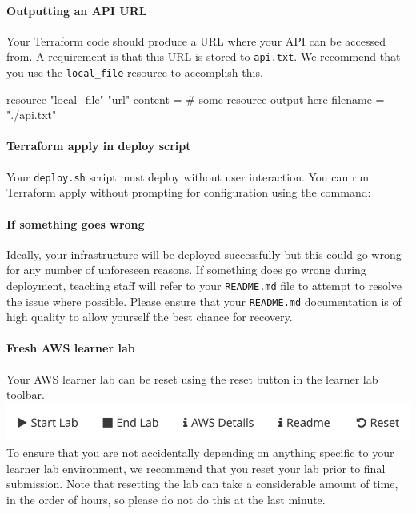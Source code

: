 \documentclass{csse4400}
\begin{document}
\paragraph{Outputting an API URL}
Your Terraform code should produce a URL where your API can be accessed from.
A requirement is that this URL is stored to \texttt{api.txt}.
We recommend that you use the \texttt{local\_file} resource to accomplish this.

\begin{code}[language=terraform]{}
resource "local_file" "url" {
    content  = # some resource output here
    filename = "./api.txt"
}
\end{code}

\paragraph{Terraform apply in deploy script}
Your \texttt{deploy.sh} script must deploy without user interaction.
You can run Terraform apply without prompting for configuration using the command:

\paragraph{If something goes wrong}
Ideally, your infrastructure will be deployed successfully but this could go wrong for any number of unforeseen reasons.
If something does go wrong during deployment,
teaching staff will refer to your \texttt{README.md} file to attempt to resolve the issue where possible.
Please ensure that your \texttt{README.md} documentation is of high quality to allow yourself the best chance for recovery.

\paragraph{Fresh AWS learner lab}
Your AWS learner lab can be reset using the reset button in the learner lab toolbar.
\includegraphics[width=\textwidth]{images/reset-button.png}
To ensure that you are not accidentally depending on anything specific to your learner lab environment,
we recommend that you reset your lab prior to final submission.
Note that resetting the lab can take a considerable amount of time,
in the order of hours,
so please do not do this at the last minute.
\end{document}
